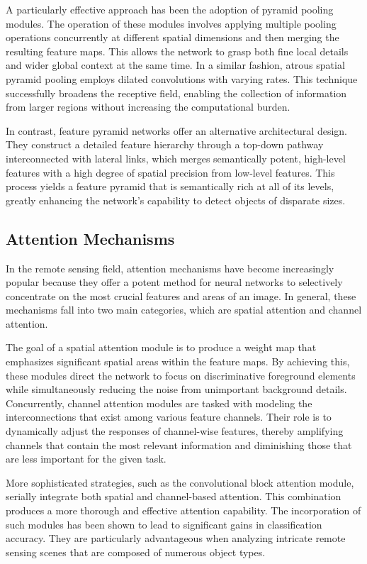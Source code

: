\documentclass[12pt,a4paper]{article}
\begin{document}
A particularly effective approach has been the adoption of pyramid pooling modules. The operation of these modules involves applying multiple pooling operations concurrently at different spatial dimensions and then merging the resulting feature maps. This allows the network to grasp both fine local details and wider global context at the same time. In a similar fashion, atrous spatial pyramid pooling employs dilated convolutions with varying rates. This technique successfully broadens the receptive field, enabling the collection of information from larger regions without increasing the computational burden.

In contrast, feature pyramid networks offer an alternative architectural design. They construct a detailed feature hierarchy through a top-down pathway interconnected with lateral links, which merges semantically potent, high-level features with a high degree of spatial precision from low-level features. This process yields a feature pyramid that is semantically rich at all of its levels, greatly enhancing the network's capability to detect objects of disparate sizes.

\subsection{Attention Mechanisms}
In the remote sensing field, attention mechanisms have become increasingly popular because they offer a potent method for neural networks to selectively concentrate on the most crucial features and areas of an image. In general, these mechanisms fall into two main categories, which are spatial attention and channel attention.

The goal of a spatial attention module is to produce a weight map that emphasizes significant spatial areas within the feature maps. By achieving this, these modules direct the network to focus on discriminative foreground elements while simultaneously reducing the noise from unimportant background details. Concurrently, channel attention modules are tasked with modeling the interconnections that exist among various feature channels. Their role is to dynamically adjust the responses of channel-wise features, thereby amplifying channels that contain the most relevant information and diminishing those that are less important for the given task.

More sophisticated strategies, such as the convolutional block attention module, serially integrate both spatial and channel-based attention. This combination produces a more thorough and effective attention capability. The incorporation of such modules has been shown to lead to significant gains in classification accuracy. They are particularly advantageous when analyzing intricate remote sensing scenes that are composed of numerous object types.
\end{document}
